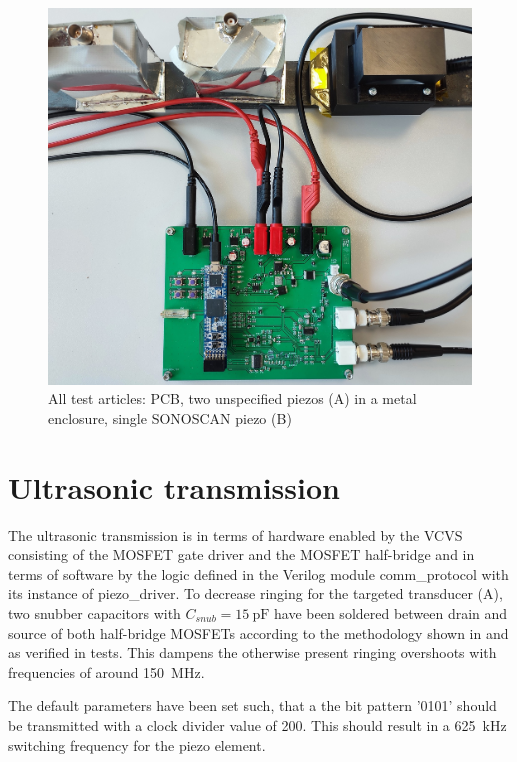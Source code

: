 \documentclass[
	english,
	ruledheaders=section, %
	class=report,%
	thesis={type=Project Seminar Report},%
	accentcolor=TUDa-1d, %
	custommargins=false,%
	marginpar=false,%
	parskip=half-,%
	fontsize=11pt,%
]{tudapub}
\begin{document}
\begin{figure}[H]
    \centering
    \includegraphics[width=0.8\columnwidth]{images/versuchsaufbau2.jpg}
    \caption{All test articles: PCB, two unspecified piezos (A) in a metal enclosure, single SONOSCAN piezo (B)}
    \label{img:versuchsaufbau}
\end{figure}

\section{Ultrasonic transmission}
The ultrasonic transmission is in terms of hardware enabled by the \gls{VCVS} consisting of the \gls{MOSFET} gate driver and the \gls{MOSFET} half-bridge and in terms of software by the logic defined in the Verilog module comm\_protocol with its instance of piezo\_driver. To decrease ringing for the targeted transducer (A), two snubber capacitors with $C_{snub} = \SI{15}{\pico\farad}$ have been soldered between drain and source of both half-bridge \glspl{MOSFET} according to the methodology shown in \autocite{johnbettenPowerTipsCalculate2016} and as verified in tests. This dampens the otherwise present ringing overshoots with frequencies of around \SI{150}{\mega\hertz}.

The default parameters have been set such, that a the bit pattern '0101' should be transmitted with a clock divider value of 200. This should result in a \SI{625}{\kilo\hertz} switching frequency for the piezo element.
\end{document}
